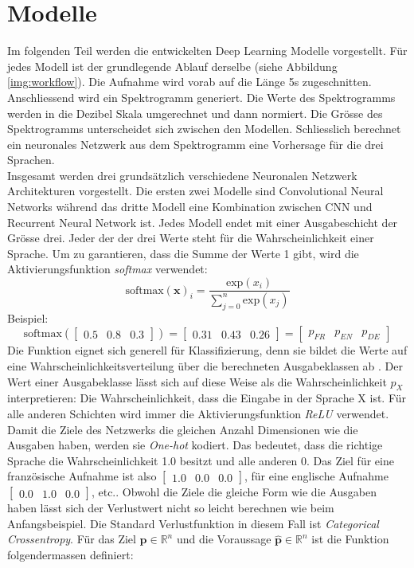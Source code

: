           \section{Modelle}
Im folgenden Teil werden die entwickelten Deep Learning Modelle vorgestellt. Für jedes Modell ist der grundlegende Ablauf derselbe (siehe Abbildung \ref{img:workflow}). Die Aufnahme wird vorab auf die Länge 5s zugeschnitten. Anschliessend wird ein Spektrogramm generiert. Die Werte des Spektrogramms werden in die Dezibel Skala umgerechnet und dann normiert. Die Grösse des Spektrogramms unterscheidet sich zwischen den Modellen. Schliesslich berechnet ein neuronales Netzwerk aus dem Spektrogramm eine Vorhersage für die drei Sprachen. 
\\
Insgesamt werden drei grundsätzlich verschiedene Neuronalen Netzwerk Architekturen vorgestellt. Die ersten zwei Modelle sind Convolutional Neural Networks während das dritte Modell eine Kombination zwischen CNN und Recurrent Neural Network ist. Jedes Modell endet mit einer Ausgabeschicht der Grösse drei. Jeder der der drei Werte steht für die Wahrscheinlichkeit einer Sprache. Um zu garantieren, dass die Summe der Werte 1 gibt, wird die Aktivierungsfunktion \textit{softmax} verwendet:
$$ \text{softmax}(\boldsymbol x)_i = \frac{\text{exp}(x_i)}{\sum_{j=0}^{n} \text{exp}(x_j)}$$
Beispiel: 
$$ \text{softmax}(\begin{bmatrix} 0.5 & 0.8 & 0.3\end{bmatrix}) = \begin{bmatrix} 0.31 & 0.43 & 0.26\end{bmatrix} = \begin{bmatrix} p_{FR} & p_{EN} & p_{DE}\end{bmatrix}$$
Die Funktion eignet sich generell für Klassifizierung, denn sie bildet die Werte auf eine Wahrscheinlichkeitsverteilung über die berechneten Ausgabeklassen ab \parencite[][S. 180-184]{goodfellow}. Der Wert einer Ausgabeklasse lässt sich auf diese Weise als die Wahrscheinlichkeit $p_{X}$ interpretieren: Die Wahrscheinlichkeit, dass die Eingabe in der Sprache X ist. Für alle anderen Schichten wird immer die Aktivierungsfunktion \textit{ReLU} verwendet.
\\
Damit die Ziele des Netzwerks die gleichen Anzahl Dimensionen wie die Ausgaben haben, werden sie \textit{One-hot}\parencite{chollet} kodiert. Das bedeutet, dass die richtige Sprache die Wahrscheinlichkeit 1.0 besitzt und alle anderen 0. Das Ziel für eine französische Aufnahme ist also $\begin{bmatrix} 1.0 & 0.0 & 0.0\end{bmatrix}$, für eine englische Aufnahme $\begin{bmatrix} 0.0 & 1.0 & 0.0\end{bmatrix}$, etc.. Obwohl die Ziele die gleiche Form wie die Ausgaben haben lässt sich der Verlustwert nicht so leicht berechnen wie beim Anfangsbeispiel. Die Standard Verlustfunktion in diesem Fall ist \textit{Categorical Crossentropy}\parencite{chollet}. Für das Ziel $\boldsymbol{p} \in \mathbb{R}^n$ und die Voraussage $\boldsymbol{\hat{p}} \in \mathbb{R}^n$ ist die Funktion folgendermassen definiert:

